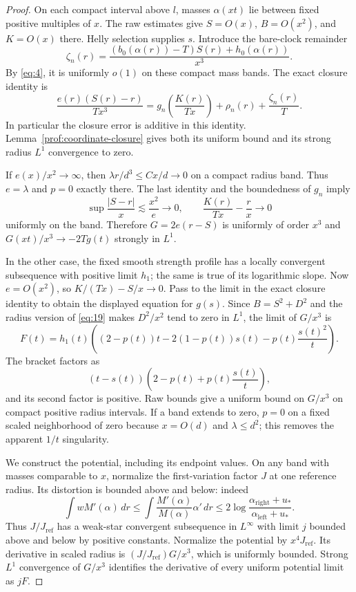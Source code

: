 \begin{proof}
On each compact interval above $l$, masses $\alpha(xt)$ lie between
fixed positive multiples of $x$. The raw estimates give $S=O(x)$,
$B=O(x^2)$, and $K=O(x)$ there. Helly selection supplies $s$.
Introduce the bare-clock remainder
\[
 \zeta_n(r)=\frac{(b_0(\alpha(r))-T)S(r)+h_0(\alpha(r))}{x^3}.
\]
By \eqref{eq:4}, it is uniformly $o(1)$ on these compact mass bands.
The exact closure identity is
\[
 \frac{e(r)(S(r)-r)}{Tx^3}
   =g_n\!\left(\frac{K(r)}{Tx}\right)+\rho_n(r)+\frac{\zeta_n(r)}T.
\]
In particular the closure error is additive in this identity.
Lemma~\ref{prof:coordinate-closure} gives both its uniform bound
and its strong radius $L^1$ convergence to zero.

If $e(x)/x^2\to\infty$, then
$\lambda r/d^3\le Cx/d\to0$ on a compact radius band. Thus
$e=\lambda$ and $p=0$ exactly there. The last identity and the
boundedness of $g_n$ imply
\[
 \sup\frac{|S-r|}{x}\lesssim\frac{x^2}{e}\longrightarrow0,
 \qquad \frac{K(r)}{Tx}-\frac rx\longrightarrow0
\]
uniformly on the band. Therefore $G=2e(r-S)$ is uniformly of order
$x^3$ and $G(xt)/x^3\to-2Tg(t)$ strongly in $L^1$.

In the other case, the fixed smooth strength profile has a locally
convergent subsequence with positive limit $h_1$; the same is true
of its logarithmic slope. Now $e=O(x^2)$, so $K/(Tx)-S/x\to0$.
Pass to the limit in the exact closure identity to obtain the
displayed equation for $g(s)$. Since $B=S^2+D^2$ and the radius
version of \eqref{eq:19} makes $D^2/x^2$ tend to zero in $L^1$,
the limit of $G/x^3$ is
\[
 F(t)=h_1(t)\left((2-p(t))t-2(1-p(t))s(t)
                            -p(t)\frac{s(t)^2}{t}\right).
\]
The bracket factors as
\[
 (t-s(t))\left(2-p(t)+p(t)\frac{s(t)}t\right),
\]
and its second factor is positive. Raw bounds give a uniform bound
on $G/x^3$ on compact positive radius intervals. If a band extends
to zero, $p=0$ on a fixed scaled neighborhood of zero because
$x=O(d)$ and $\lambda\le d^2$; this removes the apparent $1/t$
singularity.

We construct the potential, including its endpoint values. On any
band with masses comparable to $x$, normalize the first-variation
factor $J$ at one reference radius. Its distortion is bounded above
and below: indeed
\[
 \int wM'(\alpha)\,dr
 \le\int \frac{M'(\alpha)}{M(\alpha)}\alpha'\,dr
 \le2\log\frac{\alpha_{\mathrm{right}}+u_*}
                    {\alpha_{\mathrm{left}}+u_*}.
\]
Thus $J/J_{\mathrm{ref}}$ has a weak-star convergent subsequence in
$L^\infty$ with limit $j$ bounded above and below by positive
constants. Normalize the potential by $x^4J_{\mathrm{ref}}$.
Its derivative in scaled radius is $(J/J_{\mathrm{ref}})G/x^3$,
which is uniformly bounded. Strong $L^1$ convergence of $G/x^3$
identifies the derivative of every uniform potential limit as $jF$.


\end{proof}

